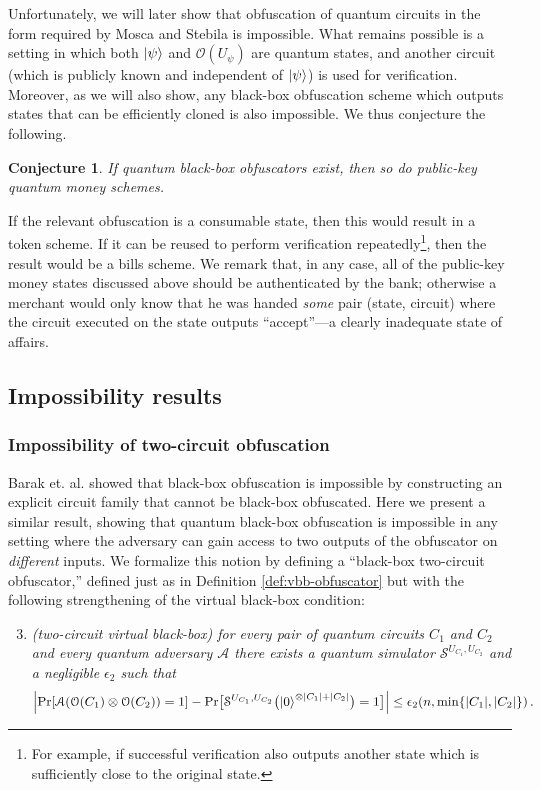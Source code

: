 \documentclass[11pt]{article}
\numberwithin{equation}{section}
\newtheorem{conjecture}{Conjecture}
\begin{document}
{Unfortunately, we will later show that obfuscation of quantum circuits in the form required by Mosca and Stebila is impossible. What remains possible is a setting in which both ${\left\vert{\psi}\right\rangle}$ and $\mathcal O(U_\psi)$ are quantum states, and another circuit (which is publicly known and independent of ${\left\vert{\psi}\right\rangle}$) is used for verification. Moreover, as we will also show, any black-box obfuscation scheme which outputs states that can be efficiently cloned is also impossible. We thus conjecture the following.
\begin{conjecture}
If quantum black-box obfuscators exist, then so do public-key quantum money schemes.
\end{conjecture}
If the relevant obfuscation is a consumable state, then this would result in a token scheme. If it can be reused to perform verification repeatedly\footnote{For example, if successful verification also outputs another state which is sufficiently close to the original state.}, then the result would be a bills scheme. We remark that, in any case, all of the public-key money states discussed above should be authenticated by the bank; otherwise a merchant would only know that he was handed \emph{some} pair (state, circuit) where the circuit executed on the state outputs ``accept''---a clearly inadequate state of affairs.

\subsection{Impossibility results}\label{vbb:impossibility}

\subsubsection{Impossibility of two-circuit obfuscation}\label{sec-twocircuit}
Barak et. al. \cite{BGIRSVY12} showed that black-box obfuscation is impossible by constructing an explicit circuit family that cannot be black-box obfuscated. 
Here we present a similar result, showing that quantum black-box obfuscation is impossible in any setting where the adversary can gain access to two outputs of the obfuscator on \emph{different} inputs. We formalize this notion by defining a ``black-box two-circuit obfuscator,''  defined just as in Definition \ref{def:vbb-obfuscator} but with the following strengthening of the virtual black-box condition:
\begin{enumerate}
\setcounter{enumi}{2}
\item \emph{(two-circuit virtual black-box) for every pair of quantum circuits $C_1$ and $C_2$ and every quantum adversary $\mathcal A$ there exists a quantum simulator $\mathcal S^{U_{C_1}, U_{C_2}}$ and a negligible $\epsilon_2$ such that}
$$
\Bigl| \text{Pr}[\mathcal A(\mathcal O(C_1) \otimes \mathcal O(C_2)) = 1] - \text{Pr}\bigl[\mathcal S^{U_{C_1}, U_{C_2}}\bigl({\left\vert{0}\right\rangle}^{\otimes |C_1| + |C_2|}\bigr) = 1\bigr] \Bigr| \leq \epsilon_2(n, \min\{|C_1|,|C_2|\})\,.
$$
\end{enumerate}

}
\end{document}
